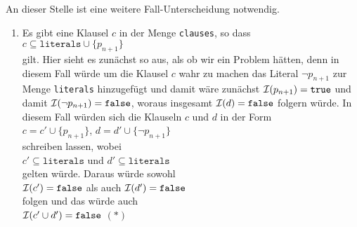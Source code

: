 \begin{enumerate}
\begin{enumerate}
                   An dieser Stelle ist eine weitere Fall-Unterscheidung notwendig.
                   \begin{enumerate}
                   \item Es gibt eine Klausel $c$ in der Menge \texttt{clauses}, so dass
                         \\[0.2cm]
                         \hspace*{1.3cm}
                         $c \subseteq \mathtt{literals} \cup \{p_{n+1}\}$
                         \\[0.2cm]
                         gilt.  Hier sieht es zun\"{a}chst so aus, als ob wir ein Problem h\"{a}tten, denn
                         in diesem Fall w\"{u}rde um die Klausel $c$ wahr zu machen das Literal $\neg p_{n+1}$ zur Menge
                         \texttt{literals} hinzugef\"{u}gt und damit w\"{a}re zun\"{a}chst $\mathcal{I}(p_{n+1}) = \mathtt{true}$ 
                         und damit $\mathcal{I}(\neg p_{n+1}) = \mathtt{false}$, woraus insgesamt 
                         $\mathcal{I}(d) = \mathtt{false}$ folgern w\"{u}rde.  In diesem Fall w\"{u}rden sich
                         die Klauseln $c$ und $d$  in der Form
                         \\[0.2cm]
                         \hspace*{1.3cm}
                         $c = c' \cup \{p_{n+1}\}$, \quad $d = d' \cup \{ \neg p_{n+1} \}$
                         \\[0.2cm]
                         schreiben lassen, wobei 
                         \\[0.2cm]
                         \hspace*{1.3cm}
                         $c' \subseteq \mathtt{literals}$  \quad und \quad $d' \subseteq \mathtt{literals}$
                         \\[0.2cm]
                         gelten w\"{u}rde.  Daraus w\"{u}rde sowohl
                         \\[0.2cm]
                         \hspace*{1.3cm}
                         $\mathcal{I}(c') = \mathtt{false}$ \quad als auch \quad $\mathcal{I}(d') = \mathtt{false}$
                         \\[0.2cm]
                         folgen und das w\"{u}rde auch
                         \\[0.2cm]
                         \hspace*{1.3cm}
                         $\mathcal{I}(c' \cup d') = \mathtt{false}$ \hspace*{\fill} $(*)$

\end{enumerate}
\end{enumerate}
\end{enumerate}
